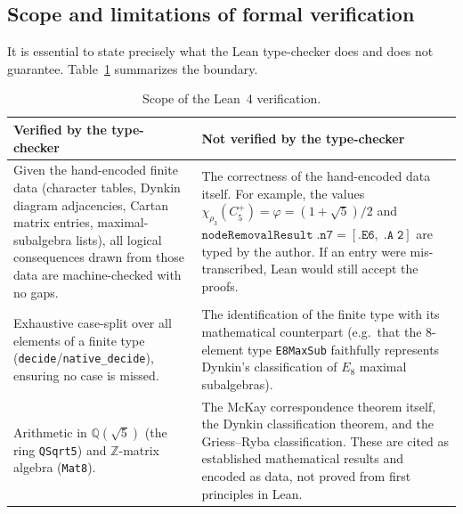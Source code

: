 \documentclass[sn-mathphys-num,Numbered]{sn-jnl}
\theoremstyle{thmstyleone}
\theoremstyle{thmstylethree}
\begin{document}
\begin{appendices}
\subsection{Scope and limitations of formal verification}
\label{subsec:lean-scope}

It is essential to state precisely what the Lean type-checker does and does not
guarantee.  Table~\ref{tab:lean-scope} summarizes the boundary.

\begin{table}[htb]
\centering
\caption{Scope of the Lean~4 verification.}\label{tab:lean-scope}
\begin{tabular}{p{}p{}}
\toprule
\textbf{Verified by the type-checker} & \textbf{Not verified by the type-checker} \\
\midrule
Given the hand-encoded finite data (character tables, Dynkin diagram
adjacencies, Cartan matrix entries, maximal-subalgebra lists),
all logical consequences drawn from those data are
machine-checked with no gaps.
&
The correctness of the hand-encoded data itself.
For example, the values
$\chi_{\rho_3}(C_5^+) = \varphi = (1+\sqrt{5})/2$
and
$\mathtt{nodeRemovalResult\;.n7} = [\mathtt{.E6},\;\mathtt{.A\;2}]$
are typed by the author.  If an entry were mis-transcribed, Lean
would still accept the proofs.
\\[4pt]
Exhaustive case-split over all elements of a finite type
(\texttt{decide}/\texttt{native\_decide}), ensuring no case is
missed.
&
The identification of the finite type with its mathematical
counterpart (e.g.\ that the 8-element type \texttt{E8MaxSub}
faithfully represents Dynkin's classification of $E_8$ maximal
subalgebras).
\\[4pt]
Arithmetic in $\mathbb{Q}(\sqrt{5})$ (the ring \texttt{QSqrt5})
and $\mathbb{Z}$-matrix algebra (\texttt{Mat8}).
&
The McKay correspondence theorem itself, the Dynkin classification
theorem, and the Griess--Ryba classification.  These are cited as
established mathematical results and encoded as data, not proved
from first principles in Lean.
\\
\bottomrule
\end{tabular}
\end{table}


\end{appendices}
\end{document}
